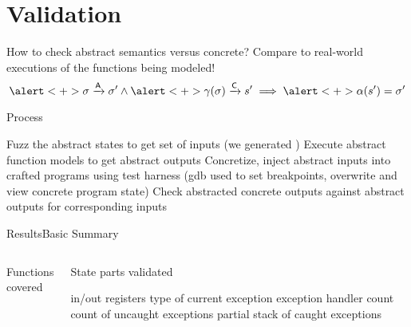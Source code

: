 \section{Validation}
\begin{frame}{How to check abstract semantics versus concrete?}
  \centering
  Compare to \alert<+>{real-world} executions of the functions being modeled!
  \vfill
  \begin{equation}
    \alert<+>{\sigma\absTransition\sigma'}
    \land
    \alert<+>{\gamma(\sigma)\concTransition s'}
    \implies
    \alert<+>{\alpha(s')=\sigma'}
    \label{eq:validation}
  \end{equation}
  \vfill
\end{frame}

\begin{frame}{Process}
  \begin{outline}[enumerate]
    \1<+-> \alert{Fuzz} the \alert{abstract} states to get set of \alert{inputs} (we generated )
    \1<+-> Execute abstract function models to get abstract \alert{outputs}
    \1<+-> \alert{Concretize}, inject abstract inputs into crafted programs using \alert{test harness} (\gls{gdb} used to set breakpoints, overwrite and view concrete program state)
    \1<+-> Check \alert{abstracted} \alert{concrete} outputs against abstract outputs for corresponding inputs
  \end{outline}
\end{frame}

\begin{frame}{Results}{Basic Summary}
  \begin{columns}
    \begin{block}{Functions covered}
      \begin{outline}
        \1 
        \1 
        \1 
        \1 
        \1 
      \end{outline}
    \end{block}
    \pause
    \begin{block}{State parts validated}
      \begin{outline}
        \1 in/out registers
        \1 type of current exception
        \1 exception handler count
        \1 count of uncaught exceptions
        \1 partial stack of caught exceptions
      \end{outline}
    \end{block}
  \end{columns}
\end{frame}

